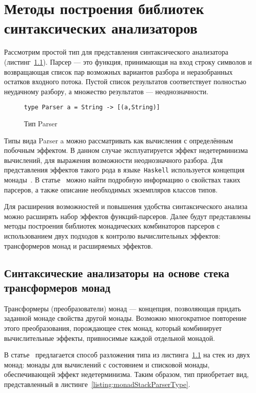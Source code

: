\chapter{Методы построения библиотек синтаксических анализаторов}

Рассмотрим простой тип для представления синтаксического анализатора
(листинг~\ref{listing:basicParserType}). Парсер --- это функция,
принимающая на вход строку символов и возвращающая список пар возможных вариантов
разбора и неразобранных остатков входного потока. Пустой список результатов
соответствует полностью неудачному разбору, а множество результатов ---
неоднозначности.

\begin{figure}[h]
\begin{lstlisting}
type Parser a = String -> [(a,String)]
\end{lstlisting}
\caption{Тип Parser}
\label{listing:basicParserType}
\end{figure}

Типы вида Parser a можно рассматривать как вычисления с
определённым побочным эффектом. В данном случае эксплуатируется эффект
недетерминизма вычислений, для выражения возможности неоднозначного разбора.
Для представления эффектов такого рода в языке~\lstinline{Haskell} используется
концепция монады~\cite{wadlerMonads}. В статье~\cite{monParsing} можно найти
подробную информацию о свойствах таких парсеров, а также описание необходимых
экземпляров классов типов.

Для расширения возможностей и повышения удобства синтаксического анализа можно расширять
набор эффектов функций-парсеров. Далее будут представлены методы построения библиотек
монадических комбинаторов парсеров с использованием двух подходов к контролю
вычислительных эффектов: трансформеров монад и расширяемых эффектов.

\section{Синтаксические анализаторы на основе стека трансформеров монад}

  Трансформеры (преобразователи) монад --- концепция, позволяющая придать заданной
  монаде свойства другой монады. Возможно многократное повторение этого преобразования,
  порождающее стек монад, который комбинирует вычислительные эффекты, привносимые
  каждой отдельной монадой.

  В статье~\cite{monParsing} предлагается способ разложения типа из
  листинга~\ref{listing:basicParserType} на стек из двух монад: монады для вычислений
  с состоянием и списковой монады, обеспечивающей эффект недетерминизма. Таким образом,
  тип приобретает вид, представленный в листинге~\ref{listing:monadStackParserType}.

